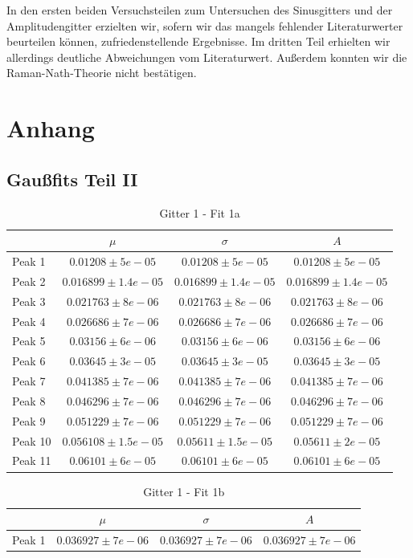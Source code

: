 \documentclass[12pt]{article}
\begin{document}
In den ersten beiden Versuchsteilen zum Untersuchen des Sinusgitters und der Amplitudengitter erzielten wir, sofern wir das mangels fehlender Literaturwerter beurteilen können, zufriedenstellende Ergebnisse. Im dritten Teil erhielten wir allerdings deutliche Abweichungen vom Literaturwert. Außerdem konnten wir die Raman-Nath-Theorie nicht bestätigen. 

\newpage
\section{Anhang} 
\subsection{Gaußfits Teil II}\label{tabellen}
\begin{table}[h!]
	\centering
	\begin{tabular}{l|c|c|c}
		&$\mu$&$\sigma$&$A$\\\hline
		Peak 1&$0.01208\pm5e-05$&$0.01208\pm5e-05$&$0.01208\pm5e-05$\\
		Peak 2&$0.016899\pm1.4e-05$&$0.016899\pm1.4e-05$&$0.016899\pm1.4e-05$\\
		Peak 3&$0.021763\pm8e-06$&$0.021763\pm8e-06$&$0.021763\pm8e-06$\\
		Peak 4&$0.026686\pm7e-06$&$0.026686\pm7e-06$&$0.026686\pm7e-06$\\
		Peak 5&$0.03156\pm6e-06$&$0.03156\pm6e-06$&$0.03156\pm6e-06$\\
		Peak 6&$0.03645\pm3e-05$&$0.03645\pm3e-05$&$0.03645\pm3e-05$\\
		Peak 7&$0.041385\pm7e-06$&$0.041385\pm7e-06$&$0.041385\pm7e-06$\\
		Peak 8&$0.046296\pm7e-06$&$0.046296\pm7e-06$&$0.046296\pm7e-06$\\
		Peak 9&$0.051229\pm7e-06$&$0.051229\pm7e-06$&$0.051229\pm7e-06$\\
		Peak 10&$0.056108\pm1.5e-05$&$0.05611\pm1.5e-05$&$0.05611\pm2e-05$\\
		Peak 11&$0.06101\pm6e-05$&$0.06101\pm6e-05$&$0.06101\pm6e-05$\\
	\end{tabular}
	\caption{Gitter 1 - Fit 1a\label{fitgitter1}}
\end{table}
\begin{table}[h!]
	\centering
	\begin{tabular}{l|c|c|c}
		&$\mu$&$\sigma$&$A$\\\hline
		Peak 1&$0.036927\pm7e-06$&$0.036927\pm7e-06$&$0.036927\pm7e-06$\\
	\end{tabular}
	\caption{Gitter 1 - Fit 1b}
\end{table}
\end{document}
